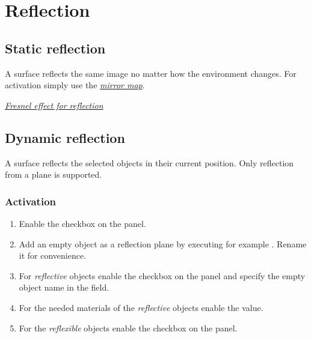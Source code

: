 \documentclass[a4paper,12pt,oneside]{sphinxmanual}
\begin{document}

\section{Reflection}
\label{materials:id6}\label{materials:index-5}\label{materials:material-mirror}

\subsection{Static reflection}
\label{materials:id7}\label{materials:index-6}\label{materials:reflection-static}
A surface reflects the same image no matter how the environment changes. For activation simply use the {\hyperref[textures:mirror-map]{\emph{mirror map}}}.




{\hyperref[materials:fresnel]{\emph{Fresnel effect for reflection}}}




\subsection{Dynamic reflection}
\label{materials:index-7}\label{materials:id8}
A surface reflects the selected objects in their current position. Only reflection from a plane is supported.


\subsubsection{Activation}
\label{materials:id9}\begin{enumerate}
\item {} 
Enable the  checkbox on the  panel.

\item {} 
Add an empty object as a reflection plane by executing for example . Rename it for convenience.

\item {} 
For \emph{reflective} objects enable the  checkbox on the  panel and specify the empty object name in the  field.

\item {} 
For the needed materials of the \emph{reflective} objects enable the  value.

\item {} 
For the \emph{reflexible} objects enable the checkbox  on the  panel.

\end{enumerate}
\end{document}
